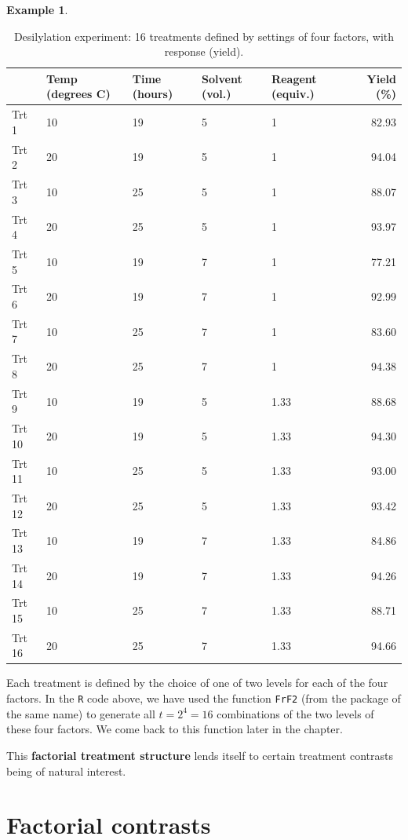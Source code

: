 \documentclass[
]{book}
\theoremstyle{definition}
\theoremstyle{definition}
\newtheorem{example}{Example}[chapter]
\theoremstyle{definition}
\theoremstyle{definition}
\theoremstyle{remark}
\begin{document}
\begin{example}
\begin{table}

\caption{\label{tab:factorial-desilylation-data}Desilylation experiment: 16 treatments defined 
             by settings of four factors, with response (yield).}
\centering
\begin{tabular}[t]{l|l|l|l|l|r}
\hline
  & Temp (degrees C) & Time (hours) & Solvent (vol.) & Reagent (equiv.) & Yield (\%)\\
\hline
Trt 1 & 10 & 19 & 5 & 1 & 82.93\\
\hline
Trt 2 & 20 & 19 & 5 & 1 & 94.04\\
\hline
Trt 3 & 10 & 25 & 5 & 1 & 88.07\\
\hline
Trt 4 & 20 & 25 & 5 & 1 & 93.97\\
\hline
Trt 5 & 10 & 19 & 7 & 1 & 77.21\\
\hline
Trt 6 & 20 & 19 & 7 & 1 & 92.99\\
\hline
Trt 7 & 10 & 25 & 7 & 1 & 83.60\\
\hline
Trt 8 & 20 & 25 & 7 & 1 & 94.38\\
\hline
Trt 9 & 10 & 19 & 5 & 1.33 & 88.68\\
\hline
Trt 10 & 20 & 19 & 5 & 1.33 & 94.30\\
\hline
Trt 11 & 10 & 25 & 5 & 1.33 & 93.00\\
\hline
Trt 12 & 20 & 25 & 5 & 1.33 & 93.42\\
\hline
Trt 13 & 10 & 19 & 7 & 1.33 & 84.86\\
\hline
Trt 14 & 20 & 19 & 7 & 1.33 & 94.26\\
\hline
Trt 15 & 10 & 25 & 7 & 1.33 & 88.71\\
\hline
Trt 16 & 20 & 25 & 7 & 1.33 & 94.66\\
\hline
\end{tabular}
\end{table}

Each treatment is defined by the choice of one of two levels for each of the four factors. In the \texttt{R} code above, we have used the function \texttt{FrF2} (from the package of the same name) to generate all \(t = 2^4 = 16\) combinations of the two levels of these four factors. We come back to this function later in the chapter.
\end{example}

This \textbf{factorial treatment structure} lends itself to certain treatment contrasts being of natural interest.

\hypertarget{factorial-contrasts}{%
\section{Factorial contrasts}\label{factorial-contrasts}}
\end{document}
